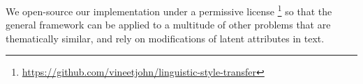 We open-source our implementation under a permissive license \footnote{\url{https://github.com/vineetjohn/linguistic-style-transfer}} so that the general framework can be applied to a multitude of other problems that are thematically similar, and rely on modifications of latent attributes in text.

